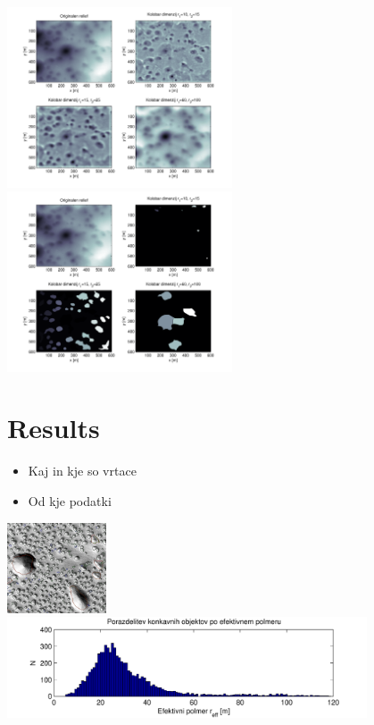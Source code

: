 \documentclass[a0,portrait]{a0poster}
\begin{document}
\begin{multicols}{2}
\begin{minipage}[b]{0.5\textwidth}
	\includegraphics[width=0.5\textwidth]{concavity-samples.pdf}
	\includegraphics[width=0.5\textwidth]{concavity-segmentation-samples.pdf}
\end{minipage}


\section*{Results}

\begin{itemize}
	\item Kaj in kje so vrtace
	\item Od kje podatki
\end{itemize}

\begin{minipage}[b]{0.5\textwidth}
	\includegraphics[width=0.22\textwidth]{menisija-vrtace}
	\includegraphics[width=0.8\textwidth]{menisija-polmeri-hist}
\end{minipage}


\end{multicols}
\end{document}
